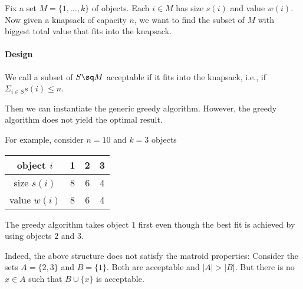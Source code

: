 Fix a set $M=\{1,\ldots,k\}$ of objects.
Each $i\in M$ has size $s(i)$ and value $w(i)$.
Now given a knapsack of capacity $n$, we want to find the subset of $M$ with biggest total value that fits into the knapsack.

\paragraph{Design}
We call a subset of $S\sq M$ acceptable if it fits into the knapsack, i.e., if $\Sigma_{i\in S}s(i)\leq n$.

Then we can instantiate the generic greedy algorithm.
However, the greedy algorithm does not yield the optimal result.

For example, consider $n=10$ and $k=3$ objects
\begin{center}
\begin{tabular}{c|ccc}
object $i$   & 1 & 2 & 3\\
\hline
size $s(i)$   & 8 & 6 & 4 \\
value $w(i)$ & 8 & 6 & 4
\end{tabular}
\end{center}
The greedy algorithm takes object $1$ first even though the best fit is achieved by using objects $2$ and $3$.

Indeed, the above structure does not satisfy the matroid properties:
Consider the sets $A=\{2,3\}$ and $B=\{1\}$. Both are acceptable and $|A|>|B|$.
But there is no $x\in A$ such that $B\cup\{x\}$ is acceptable.

